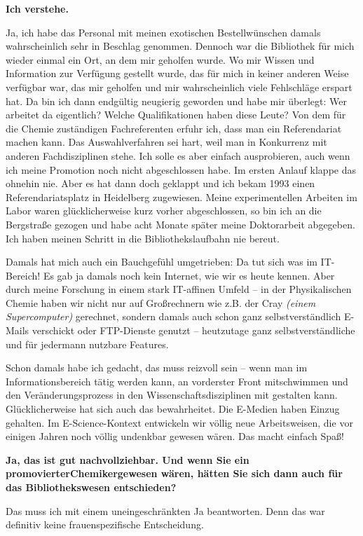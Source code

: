 \documentclass[a4paper,
fontsize=11pt,
oneside,
numbers=noperiodatend,
parskip=half-,
bibliography=totoc,
final
]{scrartcl}
\begin{document}
\textbf{Ich verstehe.~}

Ja, ich habe das Personal mit meinen exotischen Bestellwünschen damals
wahrscheinlich sehr in Beschlag genommen. Dennoch war die Bibliothek für
mich wieder einmal ein Ort, an dem mir geholfen wurde. Wo mir Wissen und
Information zur Verfügung gestellt wurde, das für mich in keiner anderen
Weise verfügbar war, das mir geholfen und mir wahrscheinlich viele
Fehlschläge erspart hat. Da bin ich dann endgültig neugierig geworden
und habe mir überlegt: Wer arbeitet da eigentlich? Welche
Qualifikationen haben diese Leute? Von dem für die Chemie zuständigen
Fachreferenten erfuhr ich, dass man ein Referendariat machen kann. Das
Auswahlverfahren sei hart, weil man in Konkurrenz mit anderen
Fachdisziplinen stehe. Ich solle es aber einfach ausprobieren, auch wenn
ich meine Promotion noch nicht abgeschlossen habe. Im ersten Anlauf
klappe das ohnehin nie. Aber es hat dann doch geklappt und ich bekam
1993 einen Referendariatsplatz in Heidelberg zugewiesen. Meine
experimentellen Arbeiten im Labor waren glücklicherweise kurz vorher
abgeschlossen, so bin ich an die Bergstraße gezogen und habe acht Monate
später meine Doktorarbeit abgegeben. Ich haben meinen Schritt in die
Bibliothekslaufbahn nie bereut.~

Damals hat mich auch ein Bauchgefühl umgetrieben: Da tut sich was im
IT-Bereich! Es gab ja damals noch kein Internet, wie wir es heute
kennen. Aber durch meine Forschung in einem stark IT-affinen Umfeld --
in der Physikalischen Chemie haben wir nicht nur auf Großrechnern wie
z.B. der Cray \emph{(einem Supercomputer)} gerechnet, sondern damals
auch schon ganz selbstverständlich E-Mails verschickt oder FTP-Dienste
genutzt -- heutzutage ganz selbstverständliche und für jedermann
nutzbare Features.

Schon damals habe ich gedacht, das muss reizvoll sein -- wenn man im
Informationsbereich tätig werden kann, an vorderster Front mitschwimmen
und den Veränderungsprozess in den Wissenschaftsdisziplinen mit
gestalten kann. Glücklicherweise hat sich auch das bewahrheitet. Die
E-Medien haben Einzug gehalten. Im E-Science-Kontext entwickeln wir
völlig neue Arbeitsweisen, die vor einigen Jahren noch völlig undenkbar
gewesen wären. Das macht einfach Spaß!~

\textbf{Ja, das ist gut nachvollziehbar. Und wenn Sie ein
promovierterChemikergewesen wären, hätten Sie sich dann auch für das
Bibliothekswesen entschieden?}

Das muss ich mit einem uneingeschränkten Ja beantworten. Denn das war
definitiv keine frauenspezifische Entscheidung.~
\end{document}
